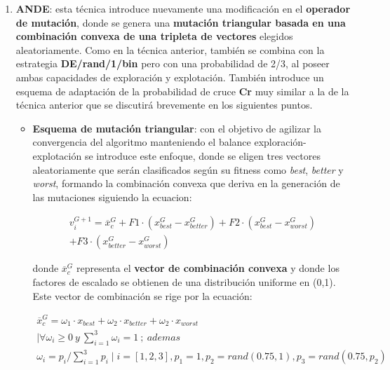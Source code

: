\begin{enumerate}
	\item \textbf{ANDE}: esta técnica introduce nuevamente una modificación en el \textbf{operador de mutación}, donde se genera una \textbf{mutación triangular basada en una combinación convexa de una tripleta de vectores} elegidos aleatoriamente. Como en la técnica anterior, también se combina con la estrategia \textbf{DE/rand/1/bin} pero con una probabilidad de 2/3, al poseer ambas capacidades de exploración y explotación. También introduce un esquema de adaptación de la probabilidad de cruce \textbf{Cr} muy similar a la de la técnica anterior que se discutirá brevemente en los siguientes puntos.
	
	\begin{itemize}
		\item \textbf{Esquema de mutación triangular}: con el objetivo de agilizar la convergencia del algoritmo manteniendo el balance exploración-explotación se introduce este enfoque, donde se eligen tres vectores aleatoriamente que serán clasificados según su fitness como \textit{best}, \textit{better} y \textit{worst}, formando la combinación convexa que deriva en la generación de las mutaciones siguiendo la ecuacion:
		
		\begin{equation}\label{eq:ANDE_Mut}
		\begin{gathered}
			v_i^{G+1} = \overline{x}_c^G + F1 \cdot (x_{best}^G -x_{better}^G) + F2 \cdot (x_{best}^G -x_{worst}^G) \\+ F3 \cdot (x_{better}^G -x_{worst}^G)
		\end{gathered}
		\end{equation}
		
		donde $\overline{x}_c^G$ representa el \textbf{vector de combinación convexa} y donde los factores de escalado se obtienen de una distribución uniforme en (0,1). Este vector de combinación se rige por la ecuación:
		
		\begin{equation}\label{eq:ANDE_VCC}
		\begin{gathered}
			\overline{x}_c^G = \omega_1 \cdot x_{best} + \omega_2 \cdot x_{better} + \omega_2 \cdot x_{worst} \\
			\mid \forall \omega_i \geq 0 \ y \ \sum_{i=1}^{3} \omega_i = 1 \ ; \ ademas \\
			\omega_i = p_i / \sum_{i=1}^{3}p_i  \mid i=[1,2,3], p_1=1, p_2 = rand(0.75,1),  p_3 = rand(0.75,p_2) 
		\end{gathered}
		\end{equation}
		

\end{itemize}
\end{enumerate}
